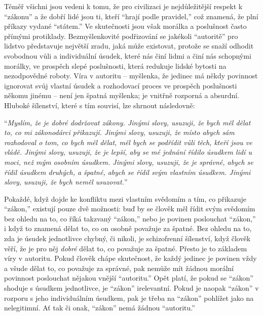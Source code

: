 \documentclass{book}
\begin{document}
Téměř všichni jsou vedeni k tomu, že pro civilizaci je nejdůležitější respekt k \enquote{zákonu} a že dobří lidé jsou ti, kteří \enquote{hrají podle pravidel,} což znamená, že plní příkazy vydané \enquote{státem.} Ve skutečnosti jsou však morálka a poslušnost často přímými protiklady. Bezmyšlenkovité podřizování se jakékoli \enquote{autoritě} pro lidstvo představuje největší zradu, jaká může existovat, protože se snaží odhodit svobodnou vůli a individuální úsudek, které nás činí lidmi a činí nás schopnými morálky, ve prospěch slepé poslušnosti, která redukuje lidské bytosti na nezodpovědné roboty. Víra v autoritu -- myšlenka, že jedinec má někdy povinnost ignorovat svůj vlastní úsudek a rozhodovací proces ve prospěch poslušnosti někomu jinému -- není jen špatná myšlenka; je vnitřně rozporná a absurdní. Hluboké šílenství, které s tím souvisí, lze shrnout následovně:

\enquote{\emph{Myslím, že je dobré dodržovat zákony. Jinými slovy, usuzuji, že bych měl dělat to, co mi zákonodárci přikazují. Jinými slovy, usuzuji, že místo abych sám rozhodoval o tom, co bych měl dělat, měl bych se podřídit vůli těch, kteří jsou ve vládě. Jinými slovy, usuzuji, že je lepší, aby se mé jednání řídilo úsudkem lidí u moci, než mým osobním úsudkem. Jinými slovy, usuzuji, že je správné, abych se řídil úsudkem druhých, a špatné, abych se řídil svým vlastním úsudkem. Jinými slovy, usuzuji, že bych neměl usuzovat.}}

Pokaždé, když dojde ke konfliktu mezi vlastním svědomím a tím, co přikazuje \enquote{zákon,} existují pouze dvě možnosti: buď by se člověk měl řídit svým svědomím bez ohledu na to, co říká takzvaný \enquote{zákon,} nebo je povinen poslouchat \enquote{zákon,} i když to znamená dělat to, co on osobně považuje za špatné. Bez ohledu na to, zda je úsudek jednotlivce chybný, či nikoli, je schizofrenní šílenství, když člověk věří, že je pro něj \emph{dobré} dělat to, co považuje za špatné. Přesto je to základem víry v autoritu. Pokud člověk chápe skutečnost, že každý jedinec je povinen vždy a všude dělat to, co považuje za správné, pak nemůže mít žádnou morální povinnost poslouchat nějakou vnější \enquote{autoritu.} Opět platí, že pokud se \enquote{zákon} shoduje s úsudkem jednotlivce, je \enquote{zákon} irelevantní. Pokud je naopak \enquote{zákon} v rozporu s jeho individuálním úsudkem, pak je třeba na \enquote{zákon} pohlížet jako na nelegitimní. Ať tak či onak, \enquote{zákon} nemá žádnou \enquote{autoritu.}
\end{document}
